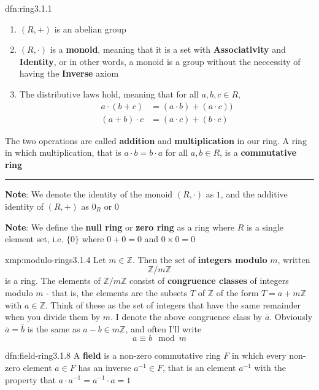 \documentclass[landscape, 8pt]{extarticle}
\begin{document}
\begin{multicols}{3}
\begin{dfn}{dfn:ring}{3.1.1}
    \begin{enumerate}
        \setlength\itemsep{0em}
        \item $(R, +)$ is an abelian group
        \item $(R, \cdot)$ is a \textbf{monoid}, meaning that it is a set with \textbf{Associativity} and \textbf{Identity}, or in other words, a monoid is a group without the neccessity of having the \textbf{Inverse} axiom
        \item The distributive laws hold, meaning that for all $a,b,c\in R$,
            \begin{align*}
                a \cdot (b + c) &= (a \cdot b) + (a \cdot c)) \\
                (a + b) \cdot c &= (a \cdot c) + (b \cdot c)
            \end{align*}
    \end{enumerate}
    The two operations are called \textbf{addition} and \textbf{multiplication} in our ring. A ring in which multiplication, that is $a \cdot b = b \cdot a$ for all $a,b\in R$, is a \textbf{commutative ring}

    \noindent\rule{\textwidth}{0.2pt}

    \textbf{Note}: We denote the identity of the monoid $(R, \cdot)$ as $1$, and the additive identity of $(R, +)$ as $0_{R}$ or $0$

    \textbf{Note}: We define the \textbf{null ring} or \textbf{zero ring} as a ring where $R$ is a single element set, i.e. $\{0\}$ where $0 + 0 = 0$ and $0 \times 0 = 0$
\end{dfn}


\begin{xmp}{xmp:modulo-rings}{3.1.4}
    Let $m\in \mathbb{Z}$. Then the set of \textbf{integers modulo} $m$, written
    \[\mathbb{Z} / m\mathbb{Z}\]
    is a ring. The elements of $\mathbb{Z} / m\mathbb{Z}$ consist of \textbf{congruence classes} of integers modulo $m$ - that is, the elements are the subsets $T$ of $\mathbb{Z}$ of the form $T = a + m\mathbb{Z}$ with $a\in \mathbb{Z}$. Think of these as the set of integers that have the same remainder when you divide them by $m$. I denote the above congruence class by $\overline{a}$. Obviously $\overline{a} = \overline{b}$ is the same as $a-b\in m\mathbb{Z}$, and often I'll write
    \[a \equiv b \mod m\]
\end{xmp}

\begin{dfn}{dfn:field-ring}{3.1.8}
    A \textbf{field} is a non-zero commutative ring $F$ in which every non-zero element $a\in F$ has an inverse $a^{-1}\in F$, that is an element $a^{-1}$ with the property that $a \cdot a^{-1} = a^{-1} \cdot a = 1$
\end{dfn}




\end{multicols}
\end{document}
